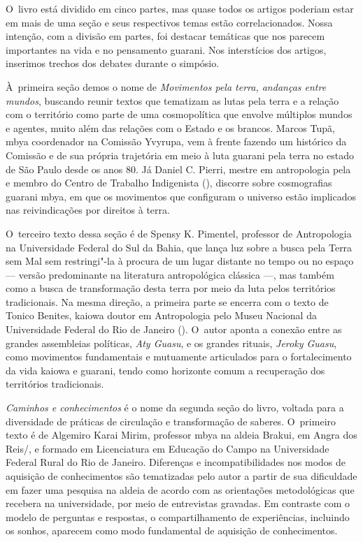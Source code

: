 O~livro está dividido em cinco partes, mas quase todos os artigos
poderiam estar em mais de uma seção e seus respectivos temas estão
correlacionados. Nossa intenção, com a divisão em partes, foi destacar
temáticas que nos parecem importantes na vida e no pensamento guarani.
Nos interstícios dos artigos, inserimos trechos dos debates durante o
simpósio.

À~primeira seção demos o nome de \emph{Movimentos pela terra, andanças entre
mundos}, buscando reunir textos que tematizam as lutas pela terra e a
relação com o território como parte de uma cosmopolítica que envolve
múltiplos mundos e agentes, muito além das relações com o Estado e os
brancos. Marcos Tupã, mbya coordenador na Comissão Yvyrupa, vem à
frente fazendo um histórico da Comissão e de sua própria trajetória em
meio à luta guarani pela terra no estado de São Paulo desde os anos 80.
Já Daniel C. Pierri, mestre em antropologia pela  e membro do Centro
de Trabalho Indigenista (), discorre sobre cosmografias guarani
mbya, em que os movimentos que configuram o universo estão implicados
nas reivindicações por direitos à terra.

O~terceiro texto dessa seção é de Spensy K. Pimentel, professor de
Antropologia na Universidade Federal do Sul da Bahia, que lança luz
sobre a busca pela Terra sem Mal sem restringi"-la à procura de um lugar
distante no tempo ou no espaço --- versão predominante na literatura
antropológica clássica ---, mas também como a busca de transformação
desta terra por meio da luta pelos territórios tradicionais. Na mesma
direção, a primeira parte se encerra com o texto de Tonico Benites,
kaiowa doutor em Antropologia pelo Museu Nacional da Universidade
Federal do Rio de Janeiro (). O~autor aponta a conexão entre as
grandes assembleias políticas, \emph{Aty Guasu}, e os grandes rituais, \emph{Jeroky
Guasu}, como movimentos fundamentais e mutuamente articulados para o
fortalecimento da vida kaiowa e guarani, tendo como horizonte comum a
recuperação dos territórios tradicionais.

\emph{Caminhos e conhecimentos} é o nome da segunda seção do livro, voltada
para a diversidade de práticas de circulação e transformação de
saberes. O~primeiro texto é de Algemiro Karai Mirim, professor mbya na
aldeia Brakui, em Angra dos Reis/, e formado em Licenciatura em
Educação do Campo na Universidade Federal Rural do Rio de Janeiro.
Diferenças e incompatibilidades nos modos de aquisição de conhecimentos
são tematizadas pelo autor a partir de sua dificuldade em fazer uma
pesquisa na aldeia de acordo com as orientações metodológicas que
recebera na universidade, por meio de entrevistas gravadas. Em
contraste com o modelo de perguntas e respostas, o compartilhamento de
experiências, incluindo os sonhos, aparecem como modo fundamental de
aquisição de conhecimentos. 

